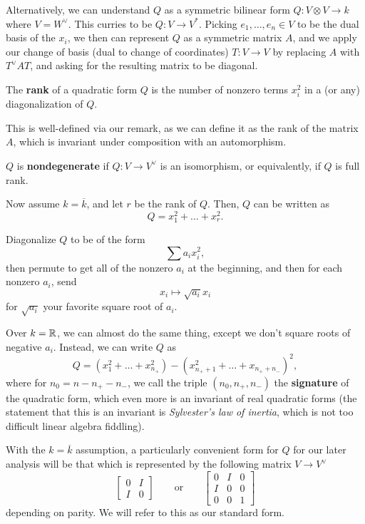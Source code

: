 \documentclass[12pt]{article}
\begin{document}
\begin{rmk}
    Alternatively, we can understand $Q$ as a symmetric bilinear form $Q: V\otimes V \to k$ where $V=W^\vee$. This curries to be $Q: V\to V^*$. Picking $e_1,\dots,e_n\in V$ to be the dual basis of the $x_i$, we then can represent $Q$ as a symmetric matrix $A$, and we apply our change of basis (dual to change of coordinates) $T:V\to V$ by replacing $A$ with $T^\vee AT$, and asking for the resulting matrix to be diagonal.
\end{rmk}

\begin{defn}
    The \textbf{rank} of a quadratic form $Q$ is the number of nonzero terms $x_i^2$ in a (or any) diagonalization of $Q$.
\end{defn}

This is well-defined via our remark, as we can define it as the rank of the matrix $A$, which is invariant under composition with an automorphism.

\begin{defn}
    $Q$ is \textbf{nondegenerate} if $Q:V\to V^\vee$ is an isomorphism, or equivalently, if $Q$ is full rank.
\end{defn}

\begin{prop}
    Now assume $k=\overline{k}$, and let $r$ be the rank of $Q$. Then, $Q$ can be written as
    \[Q=x_1^2+\dots+x_r^2.\]
\end{prop}
\begin{prop}
    Diagonalize $Q$ to be of the form
    \[\sum a_i x_i^2,\]
    then permute to get all of the nonzero $a_i$ at the beginning, and then for each nonzero $a_i$, send
    \[x_i \mapsto \sqrt{a_i} x_i\]
    for $\sqrt{a_i}$ your favorite square root of $a_i$.
\end{prop}

\begin{rmk}
    Over $k=\mathbb{R}$, we can almost do the same thing, except we don't square roots of negative $a_i$. Instead, we can write $Q$ as
    \[Q = (x_1^2+\dots + x_{n_+}^2) - (x_{n_+ +1}^2 + \dots + x_{n_+ + n_-})^2,\]
    where for $n_0=n-n_+-n_-$, we call the triple $(n_0,n_+,n_-)$ the \textbf{signature} of the quadratic form, which even more is an invariant of real quadratic forms (the statement that this is an invariant is \textit{Sylvester's law of inertia}, which is not too difficult linear algebra fiddling).
\end{rmk}

With the $k=\overline{k}$ assumption, a particularly convenient form for $Q$ for our later analysis will be that which is represented by the following matrix $V\to V^\vee$
\[\begin{bmatrix}
    0 & I\\
    I & 0
\end{bmatrix} \qquad \text{or} \qquad \begin{bmatrix}
    0 & I & 0\\
    I & 0 & 0\\
    0 & 0 & 1
\end{bmatrix}\]
depending on parity. We will refer to this as our standard form.
\end{document}
